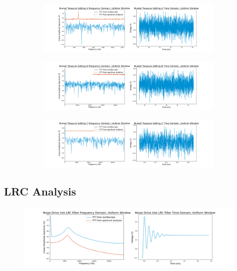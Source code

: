 \documentclass[12pt]{article}
\begin{document}
    \begin{figure}[!ht]
        \centering
        \begin{subfigure}[h]{\textwidth}
        \includegraphics[width=\textwidth]{Buried Treasure Setting A (uniform)}
        \caption{}
        \label{fig:buried A}
        \end{subfigure}
        \begin{subfigure}[h]{\textwidth}
        \includegraphics[width=\textwidth]{Buried Treasure Setting B (uniform)}
        \caption{}
        \label{fig:buried B}
        \end{subfigure}
        \begin{subfigure}[h]{\textwidth}
        \includegraphics[width=\textwidth]{Buried Treasure Setting C (uniform)}
        \caption{}
        \label{fig:buried C}
        \end{subfigure}
    \end{figure} %
    \subsection{LRC Analysis}
    
    \begin{figure}
    \centering
        \includegraphics[width=\textwidth]{Noise Drive into LRC Filter (uniform)}
        \caption{}
        \label{fig:LRC fft}
    \end{figure} %
    
\end{document}
